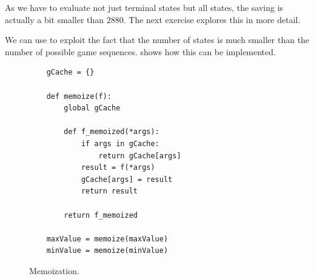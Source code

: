 As we have to evaluate not just terminal states but all states, the saving is actually a bit smaller than
$2880$.  The next exercise explores this in more detail.

We can use   to exploit the fact that the number of states is much smaller
than the number of possible game sequences. 
 shows how this can be implemented.

\begin{figure}[!ht]
\centering
\begin{verbatim}
    gCache = {}

    def memoize(f):
        global gCache

        def f_memoized(*args):
            if args in gCache:
                return gCache[args]
            result = f(*args)
            gCache[args] = result
            return result

        return f_memoized
  
    maxValue = memoize(maxValue)
    minValue = memoize(minValue)
\end{verbatim}
\caption{Memoization.}
\label{fig:Minimax.ipynb-mem}
\end{figure}
\FloatBarrier

